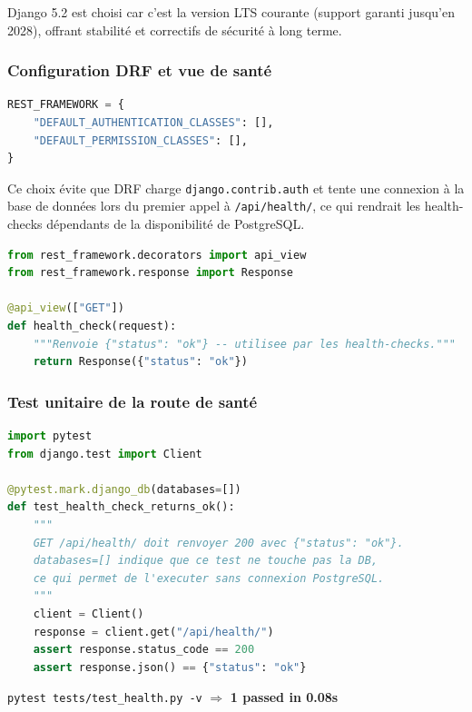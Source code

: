 \documentclass[11pt,a4paper]{article}
\begin{document}
Django 5.2 est choisi car c'est la version LTS courante (support garanti jusqu'en 2028),
offrant stabilité et correctifs de sécurité à long terme.

\subsubsection*{Configuration DRF et vue de santé}

\begin{lstlisting}[language=Python, caption={Configuration DRF dans base.py}]
REST_FRAMEWORK = {
    "DEFAULT_AUTHENTICATION_CLASSES": [],
    "DEFAULT_PERMISSION_CLASSES": [],
}
\end{lstlisting}

Ce choix évite que DRF charge \texttt{django.contrib.auth} et tente une connexion
à la base de données lors du premier appel à \texttt{/api/health/}, ce qui rendrait
les health-checks dépendants de la disponibilité de PostgreSQL.

\begin{lstlisting}[language=Python, caption={apps/health/views.py}]
from rest_framework.decorators import api_view
from rest_framework.response import Response

@api_view(["GET"])
def health_check(request):
    """Renvoie {"status": "ok"} -- utilisee par les health-checks."""
    return Response({"status": "ok"})
\end{lstlisting}

\subsubsection*{Test unitaire de la route de santé}

\begin{lstlisting}[language=Python, caption={tests/test\_health.py}]
import pytest
from django.test import Client

@pytest.mark.django_db(databases=[])
def test_health_check_returns_ok():
    """
    GET /api/health/ doit renvoyer 200 avec {"status": "ok"}.
    databases=[] indique que ce test ne touche pas la DB,
    ce qui permet de l'executer sans connexion PostgreSQL.
    """
    client = Client()
    response = client.get("/api/health/")
    assert response.status_code == 200
    assert response.json() == {"status": "ok"}
\end{lstlisting}

\begin{successbox}[Résultat]
\texttt{pytest tests/test\_health.py -v} \quad $\Rightarrow$ \quad
\textbf{1 passed in 0.08s}
\end{successbox}
\end{document}
